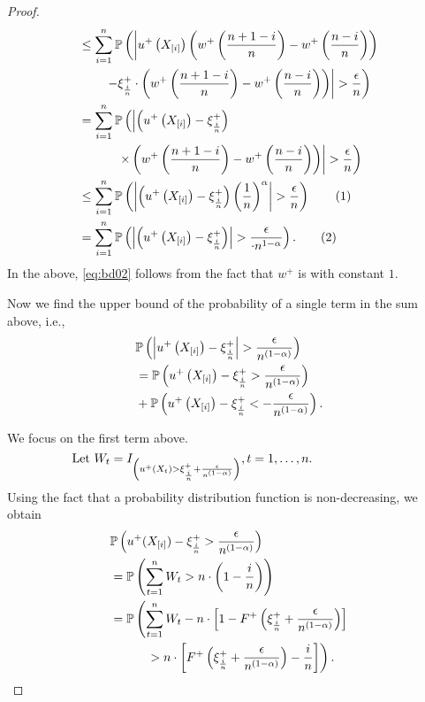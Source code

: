 \begin{proof}
\begin{align*}
& \leq \sum _{i=1}^{n} \mathbb{P}\left( \left| u^+\left(X_{[i]}\right) 
\left(w^+\left(\frac{n+1-i}{n} \right)  - w^+\left(\frac{n-i}{n} \right) \right)\right.\right. \\
&\qquad\left.\left.- \xi^+_{\frac{i}{n}} \cdot \left(w^+\left(\frac{n+1-i}{n}\right) -
w^+\left(\frac{n-i}{n}\right)\right) \right| > \frac{\epsilon}{n}\right) \\ 
& = \sum _{i=1}^{n} \mathbb{P}\left( \left| \left( u^+\left(X_{[i]}\right) -
\xi^+_{\frac{i}{n}}\right)\right.\right. \\
&\quad\qquad\left.\left.\times\left(w^+\left(\frac{n+1-i}{n} \right)  - w^+\left(\frac{n-i}{n} \right) \right) \right| > \frac{\epsilon}{n}\right)
\\ 
& \leq \sum _{i=1}^{n} \Prob{ \left| \left( u^+\left(X_{[i]}\right) - \xi^+_{\frac{i}{n}}\right) \left(\frac{1}{n}\right)^{\alpha}
\right| > \frac{\epsilon}{n}} \stepcounter{equation}\tag{\theequation}\label{eq:bd02}\\ 
& = \sum _{i=1}^{n} \Prob{ \left| \left( u^+\left(X_{[i]}\right) - \xi^+_{\frac{i}{n}}\right)
\right| > \frac{\epsilon}{\cdot n^{1-\alpha}}}.\stepcounter{equation}\tag{\theequation}\label{eq:bd12}
\end{align*}
In the above, \eqref{eq:bd02} follows from the fact that $w^+$ is \holder with constant $1$.

Now we find the upper bound of the probability of a single term in the sum above, i.e.,
\begin{align*}
& \mathbb{P}\left(  \left | u^+\left(X_{[i]}\right) - \xi^+_{\frac{i}{n}} \right | > \frac {\epsilon} {n^{\left(1-\alpha\right)}} \right) \\ 
& = \mathbb{P}\left( 
    u^+\left(X_{[i]}\right) - \xi^+_{\frac{i}{n}} > \frac {\epsilon} {n^{\left(1-\alpha\right)}} \right)\\
	&	+ \mathbb{P}\left(  u^+\left(X_{[i]}\right) -
    \xi^+_{\frac{i}{n}} < - \frac {\epsilon} {n^{\left(1-\alpha\right)}} \right).
\end{align*} 

We focus on the first term above.
$$\hspace{-6em}\text{Let } W_t = I_{\left(u^+(X_t) > \xi^+_{\frac{i}{n}} + \frac{\epsilon}{n^{(1-\alpha)}}\right)}, t=1, \ldots,n.$$ Using the fact that a probability distribution function is non-decreasing, we obtain 
\begin{align*}
& \mathbb{P}\left(  u^+(X_{[i]}) - \xi^+_{\frac{i}{n}} > \frac {\epsilon}{n^{(1-\alpha)}} \right)  \\
& = \mathbb{P}\left(  \sum _{t=1}^{n} W_t > n\cdot\left(1-\frac{i}{n}\right) \right) \\ 
& = \mathbb{P} \left( \sum _{t=1}^{n} W_t - n \cdot \left[1-F^{+}\left(\xi^+_{\frac{i}{n}}
+\frac{\epsilon}{n^{(1-\alpha)}}\right)\right] \right. \\
&\left.\quad\qquad> n \cdot \left[F^{+}\left(\xi^+_{\frac{i}{n}} +\frac{\epsilon}{n^{(1-\alpha)}}\right)
- \frac{i}{n}\right]\right).
\end{align*}


\end{proof}
